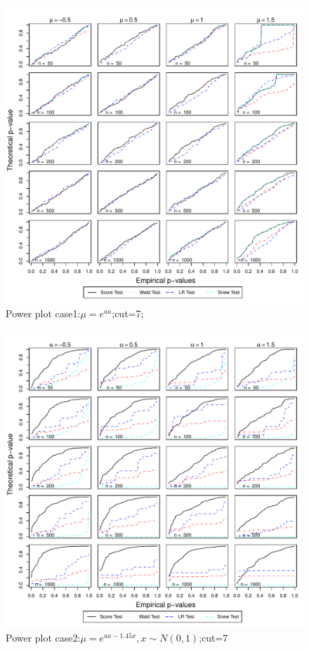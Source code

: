 \documentclass[11pt]{article}
\numberwithin{equation}{section}
\begin{document}

\begin{figure}
  \centering
  \includegraphics[width=\columnwidth]{./figure/q/q71.pdf}
  \caption{Power plot case1:$\mu=e^{aa}$;cut=7;}
\end{figure}

\begin{figure}
  \centering
  \includegraphics[width=\columnwidth]{./figure/q/q72.pdf}
  \caption{Power plot case2:$\mu=e^{aa-1.45x},x\sim N(0,1)$;cut=7}
\end{figure}
\end{document}
